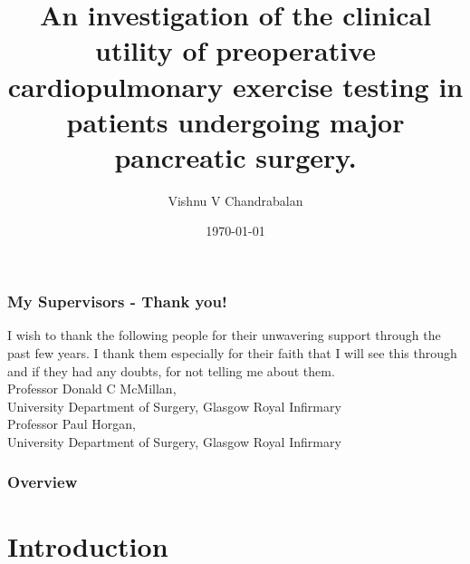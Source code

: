 \documentclass[10pt]{beamer}
\title[Improving Outcomes in Pancreatic Surgery]{An investigation of the clinical utility of preoperative cardiopulmonary exercise testing in patients undergoing major pancreatic surgery.} %
\author{Vishnu V Chandrabalan} %
\institute[UoG] %
{
University of Glasgow \\ %
\medskip
}
\date{\today} %
\begin{document}
\begin{frame}
\titlepage %
\end{frame}

\begin{frame}
	\frametitle{My Supervisors - Thank you!}
	I wish to thank the following people for their unwavering support through the past few years. I thank them especially for their faith that I will see this through and if they had any doubts, for not telling me about them.\\
	\bigskip
	Professor Donald C McMillan,\\
	University Department of Surgery, Glasgow Royal Infirmary\\
	\bigskip
	Professor Paul Horgan,\\
	University Department of Surgery, Glasgow Royal Infirmary\\
\end{frame}

\begin{frame}
\frametitle{Overview} %
\tableofcontents %
\end{frame}


\section[Chapter 1]{Introduction}
\end{document}
